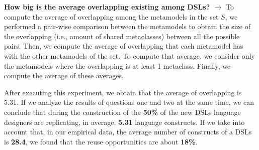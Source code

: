 \textbf{How big is the average overlapping existing among DSLs? $\rightarrow$} To compute the average of overlapping among the metamodels in the set $S$, we performed a pair-wise comparison between the metamodels to obtain the size of the overlapping (i.e., amount of shared metaclasses) between all the possible pairs. Then, we compute the average of overlapping that each metamodel has with the other metamodels of the set. To compute that average, we consider only the metamodels where the overlapping is at least 1 metaclass. Finally, we compute the average of these averages.

After executing this experiment, we obtain that the average of overlapping is 5.31. If we analyze the results of questions one and two at the same time, we can conclude that during the construction of the \textbf{50\%} of the new DSLs language designers are replicating, in average, \textbf{5.31} language constructs. If we take into account that, in our empirical data, the average number of constructs of a DSLs is \textbf{28.4}, we found that the reuse opportunities are about \textbf{18\%}. 




